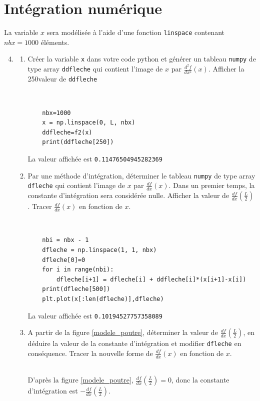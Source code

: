 \section*{Intégration numérique}

La variable $x$ sera modélisée à l'aide d'une fonction \verb?linspace? contenant $nbx=1000$ éléments.

\begin{enumerate}
\setcounter{enumi}{3}
\item \begin{enumerate}
\item Créer la variable \verb?x? dans votre code python et générer un tableau \verb?numpy? de type array \verb?ddfleche? qui contient l'image de $x$ par $\frac{d^2 f}{dx^2}(x)$. Afficher la 250\ieme valeur de \verb?ddfleche?
 \begin{solution}~\ \\
  \begin{verbatim}
	nbx=1000
	x = np.linspace(0, L, nbx)
	ddfleche=f2(x)
	print(ddfleche[250])
 \end{verbatim}
 La valeur affichée est \verb?0.11476504945282369?
\end{solution}
\item Par une méthode d'intégration, déterminer le tableau \verb?numpy? de type array \verb?dfleche? qui contient l'image de $x$ par $\frac{d f}{dx}(x)$. Dans un premier temps, la constante d'intégration sera considérée nulle. Afficher la valeur de $\frac{d f}{dx}(\frac{L}{2})$. Tracer $\frac{d f}{dx}(x)$ en fonction de $x$.
 \begin{solution}~\ \\
  \begin{verbatim}
	nbi = nbx - 1
	dfleche = np.linspace(1, 1, nbx)
	dfleche[0]=0
	for i in range(nbi):
    	dfleche[i+1] = dfleche[i] + ddfleche[i]*(x[i+1]-x[i])
	print(dfleche[500])
	plt.plot(x[:len(dfleche)],dfleche)
 \end{verbatim}
 La valeur affichée est \verb?0.10194527757358089?
\end{solution}
\item A partir de la figure \ref{modele_poutre}, déterminer la valeur de $\frac{d f}{dx}(\frac{L}{2})$, en déduire la valeur de la constante d'intégration et modifier \verb?dfleche? en conséquence. Tracer la nouvelle forme de $\frac{d f}{dx}(x)$ en fonction de $x$.
 \begin{solution}~\ \\
 D'après la figure \ref{modele_poutre}, $\frac{d f}{dx}(\frac{L}{2})=0$, donc la constante d'intégration est $-\frac{d f}{dx}(\frac{L}{2})$.

\end{solution}
\end{enumerate}
\end{enumerate}
